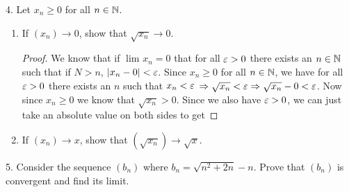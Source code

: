 4. Let $x_n \ge 0$ for all $n \in \mathbb{N}$.
\begin{enumerate}
	\item If  $\left( x_n \right) \to 0$, show that $\sqrt{x_n}  \to 0$.
	\begin{proof}
		We know that if $\lim_{} x_n = 0$ that for all $\e > 0$ there exists an $n \in \mathbb{N}$ such that if $N > n$, $\left|x_n - 0\right| < \e$. Since $x_n \ge 0$ for all $n \in \mathbb{N}$, we have for all $\e > 0$ there exists an $n$ such that $x_n < \e$ $\implies \sqrt{x_n} < \e \implies \sqrt{x_n} - 0 < \e $. Now since $x_n \ge 0$ we know that $\sqrt{x_n} > 0$. Since we also have  $\e > 0$, we can just take an absolute value on both sides to get 
	\end{proof}


	\item If $\left( x_n \right) \to x$, show that $\left( \sqrt{x_n}  \right) \to \sqrt{x} $.
\end{enumerate}

5. Consider the sequence $\left( b_n \right) $ where $b_n = \sqrt{n^{2} + 2n} - n$. Prove that $\left( b_n \right) $ is convergent and find its limit.

